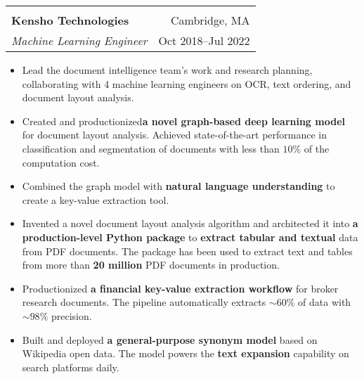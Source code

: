 \documentclass[letterpaper,11pt,oneside]{article}
\begin{document}
\begin{flushleft}
 \vspace{-0.45cm}
 \begin{tabular}{@{} l r@{} }
    \hspace{0.78\linewidth} & \hspace{0.2\linewidth} \\
    \textbf{Kensho Technologies} & Cambridge, MA \\ 
    \textit{Machine Learning Engineer} & Oct 2018--Jul 2022 \\ 
 \end{tabular}
 \end{flushleft}
 \begin{flushleft}
 \begin{small}
 \begin{itemize}[leftmargin=*]
 \item Lead the document intelligence team's work and research planning, collaborating with 4 machine learning engineers on OCR, text ordering, and document layout analysis.
 \item Created and productionized\textbf{a novel graph-based deep learning model} for document layout analysis. Achieved state-of-the-art performance in classification and segmentation of documents with less than $10\%$ of the computation cost. 
 \item Combined the graph model with \textbf{natural language understanding} to create a key-value extraction tool. 
 \item Invented a novel document layout analysis algorithm and architected it into \textbf{a production-level Python package} to \textbf{extract tabular and textual} data from PDF documents. The package has been used to extract text and tables from more than \textbf{20 million} PDF documents in production.
 \item Productionized  \textbf{a financial key-value extraction workflow} for broker research documents. The pipeline automatically extracts $\sim60\%$ of data with $\sim98\%$ precision.
 \item Built and deployed \textbf{a general-purpose synonym model} based on Wikipedia open data. The model powers the \textbf{text expansion} capability on search platforms daily.
 \end{itemize}
 \end{small}
 \end{flushleft}
\end{document}
